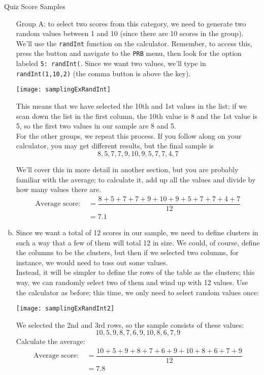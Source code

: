 \begin{example}{Quiz Score Samples}
\begin{enumerate}[(a)]
Group A: to select two scores from this category, we need to generate two random values between 1 and 10 (since there are 10 scores in the group).  We'll use the \texttt{randInt} function on the calculator.  Remember, to access this, press the  button and navigate to the \texttt{PRB} menu, then look for the option labeled \texttt{5: randInt(}.  Since we want two values, we'll type in \texttt{randInt(1,10,2)} (the comma button is above the  key).
\begin{center}
\texttt{[image: samplingExRandInt]}
\end{center}
This means that we have selected the 10th and 1st values in the list; if we scan down the list in the first column, the 10th value is 8 and the 1st value is 5, so the first two values in our sample are 8 and 5.\\

For the other groups, we repeat this process.  If you follow along on your calculator, you may get different results, but the final sample is
\[\boxed{8, 5, 7, 7, 9, 10, 9, 5, 7, 7, 4, 7}\]

We'll cover this in more detail in another section, but you are probably familiar with the average; to calculate it, add up all the values and divide by how many values there are.
\begin{align*}
\textrm{Average score: } &= \dfrac{8+5+7+7+9+10+9+5+7+7+4+7}{12}\\
&= \boxed{7.1}
\end{align*}

\item Since we want a total of 12 scores in our sample, we need to define clusters in such a way that a few of them will total 12 in size.  We could, of course, define the columns to be the clusters, but then if we selected two columns, for instance, we would need to toss out some values.\\

Instead, it will be simpler to define the rows of the table as the clusters; this way, we can randomly select two of them and wind up with 12 values.  Use the calculator as before; this time, we only need to select random values once:
\begin{center}
\texttt{[image: samplingExRandInt2]}
\end{center}
We selected the 2nd and 3rd rows, so the sample consists of these values:
\[\boxed{10, 5, 9, 8, 7, 6, 9 ,10, 8, 6, 7, 9}\]
Calculate the average:
\begin{align*}
\textrm{Average score: } &= \dfrac{10+5+9+8+7+6+9+10+8+6+7+9}{12}\\
&= \boxed{7.8}
\end{align*}


\end{enumerate}
\end{example}
